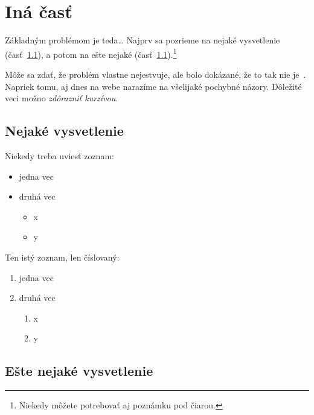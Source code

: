 \documentclass[10pt,oneside,slovak,a4paper]{article}
\begin{document}
\section{Iná časť} \label{ina}

Základným problémom je teda\ldots{} Najprv sa pozrieme na nejaké vysvetlenie (časť~\ref{ina:nejake}), a potom na ešte nejaké (časť~\ref{ina:nejake}).\footnote{Niekedy môžete potrebovať aj poznámku pod čiarou.}

Môže sa zdať, že problém vlastne nejestvuje\cite{Coplien:MPD}, ale bolo dokázané, že to tak nie je~\cite{Czarnecki:Staged, Czarnecki:Progress}. Napriek tomu, aj dnes na webe narazíme na všelijaké pochybné názory\cite{PLP-Framework}. Dôležité veci možno \emph{zdôrazniť kurzívou}.


\subsection{Nejaké vysvetlenie} \label{ina:nejake}

Niekedy treba uviesť zoznam:

\begin{itemize}
\item jedna vec
\item druhá vec
	\begin{itemize}
	\item x
	\item y
	\end{itemize}
\end{itemize}

Ten istý zoznam, len číslovaný:

\begin{enumerate}
\item jedna vec
\item druhá vec
	\begin{enumerate}
	\item x
	\item y
	\end{enumerate}
\end{enumerate}


\subsection{Ešte nejaké vysvetlenie} \label{ina:este}
\end{document}

